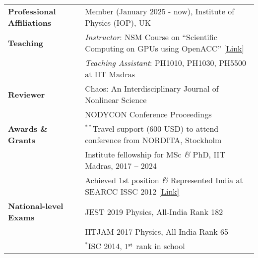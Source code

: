 \begin{longtable}[l]{@{} m{4.75cm} m{13.5cm}}

\textbf{Professional Affiliations} & Member (January 2025 - now), Institute of Physics (IOP), UK\\[0.3cm]

\textbf{Teaching} & \textit{Instructor}: NSM Course on ``Scientific Computing on GPUs using OpenACC'' \href{https://www.cse.iitm.ac.in/~rupesh/events/openacc23/}{[Link]}\\ 
& \textit{Teaching Assistant}: PH1010, PH1030, PH5500 at IIT Madras\\[0.3cm]

\textbf{Reviewer} & Chaos: An Interdisciplinary Journal of Nonlinear Science \\
                                    & NODYCON Conference Proceedings \\ [0.3cm]

\textbf{Awards \& Grants} & $^{**}$Travel support (600 USD) to attend conference from NORDITA, Stockholm\\
                                         & Institute fellowship for MSc \textit{\&} PhD, IIT Madras, 2017 -- 2024\\
                                         & Achieved 1st position \textit{\&} Represented India at SEARCC ISSC 2012 \href{https://drive.google.com/file/d/1prSSTmaBEpoaM3C4Ct2ShxLFX_cAhgtH/view?usp=sharing}{[Link]}\\[0.3cm]

\textbf{National-level Exams} & JEST 2019 Physics, All-India Rank 182\\
                                                & IITJAM 2017 Physics, All-India Rank 65\\
                                                & $^{*}$ISC 2014, $1^{\rm st}$ rank in school
\end{longtable}